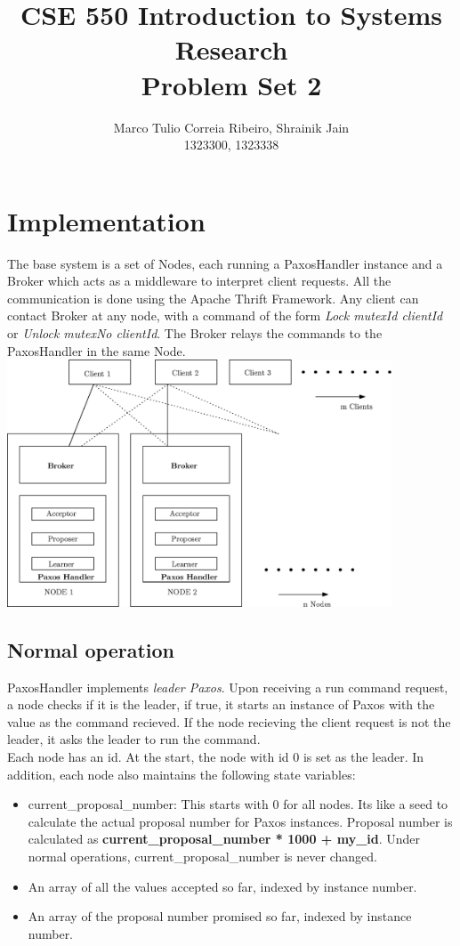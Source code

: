 \documentclass[letterpaper]{article}
\title{CSE 550 Introduction to Systems Research \\ Problem Set 2}
\begin{document}
\author{Marco Tulio Correia Ribeiro, Shrainik Jain\\ 1323300, 1323338}
\maketitle

\section{Implementation}
The base system is a set of Nodes, each running a PaxosHandler instance and a Broker which acts as a middleware to interpret client requests. All the communication is done using the Apache Thrift Framework. Any client can contact Broker at any node, with a command of the form {\em Lock mutexId clientId} or {\em Unlock mutexNo clientId}. The Broker relays the commands to the PaxosHandler in the same Node. \\

\includegraphics[width = 4.5in, keepaspectratio]{Architecture.eps}\\
\subsection{Normal operation}
PaxosHandler implements {\em leader Paxos}. Upon receiving a run command request, a node checks if it is the leader, if true, it starts an instance of Paxos with the value as the command recieved. If the node recieving the client request is not the leader, it asks the leader to run the command.\\
Each node has an id. At the start, the node with id 0 is set as the leader. In addition, each node also maintains the following state variables:
\begin{itemize}
\item current\_proposal\_number: This starts with 0 for all nodes. Its like a seed to calculate the actual proposal number for Paxos instances. Proposal number is calculated as \textbf{current\_proposal\_number * 1000 + my\_id}. Under normal operations, current\_proposal\_number is never changed.
\item An array of all the values accepted so far, indexed by instance number.
\item An array of the proposal number promised so far, indexed by instance number.
\end{itemize}
\end{document}
